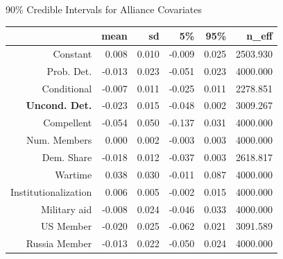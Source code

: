 \documentclass{beamer}
\begin{document}
\begin{frame}{90\% Credible Intervals for Alliance Covariates}


\begin{table}[ht]
\centering
\begin{tabular}{rrrrrr}
  \hline
 & mean & sd & 5\% & 95\% & n\_eff  \\ 
  \hline
Constant & 0.008 & 0.010 & -0.009 & 0.025 & 2503.930  \\ 
  Prob. Det. & -0.013 & 0.023 & -0.051 & 0.023 & 4000.000  \\ 
  Conditional & -0.007 & 0.011 & -0.025 & 0.011 & 2278.851 \\ 
  \textbf{Uncond. Det.} & -0.023 & 0.015 & -0.048 & 0.002 & 3009.267  \\ 
  Compellent & -0.054 & 0.050 & -0.137 & 0.031 & 4000.000  \\ 
  Num. Members & 0.000 & 0.002 & -0.003 & 0.003 & 4000.000  \\ 
  Dem. Share & -0.018 & 0.012 & -0.037 & 0.003 & 2618.817 \\ 
  Wartime & 0.038 & 0.030 & -0.011 & 0.087 & 4000.000  \\ 
  Institutionalization & 0.006 & 0.005 & -0.002 & 0.015 & 4000.000  \\ 
  Military aid & -0.008 & 0.024 & -0.046 & 0.033 & 4000.000  \\ 
  US Member & -0.020 & 0.025 & -0.062 & 0.021 & 3091.589 \\ 
  Russia Member & -0.013 & 0.022 & -0.050 & 0.024 & 4000.000  \\ 
   \hline
\end{tabular}
\end{table}

\end{frame}


\end{document}
